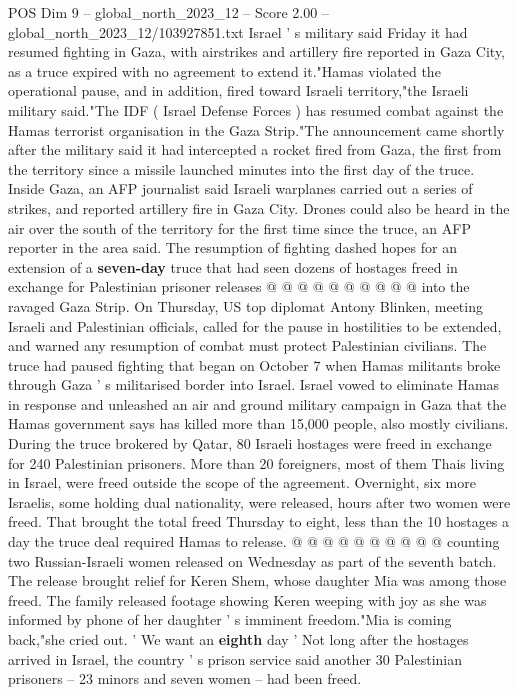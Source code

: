 \begin{textsample}{POS Dim 9 – global\_north\_2023\_12 – Score 2.00 – global\_north\_2023\_12/103927851.txt}  \label{ex:f9_pos_161}
Israel ' s military said Friday it had resumed fighting in Gaza, with airstrikes and artillery fire reported in Gaza City, as a truce expired with no agreement to extend it."Hamas violated the operational pause, and in addition, fired toward Israeli territory,"the Israeli military said."The IDF ( Israel Defense Forces ) has resumed combat against the Hamas terrorist organisation in the Gaza Strip."The announcement came shortly after the military said it had intercepted a rocket fired from Gaza, the first from the territory since a missile launched minutes into the first day of the truce.
Inside Gaza, an AFP journalist said Israeli warplanes carried out a series of strikes, and reported artillery fire in Gaza City.
Drones could also be heard in the air over the south of the territory for the first time since the truce, an AFP reporter in the area said.
The resumption of fighting dashed hopes for an extension of a \textbf{seven-day} truce that had seen dozens of hostages freed in exchange for Palestinian prisoner releases @ @ @ @ @ @ @ @ @ @ into the ravaged Gaza Strip.
On Thursday, US top diplomat Antony Blinken, meeting Israeli and Palestinian officials, called for the pause in hostilities to be extended, and warned any resumption of combat must protect Palestinian civilians.
The truce had paused fighting that began on October 7 when Hamas militants broke through Gaza ' s militarised border into Israel.
Israel vowed to eliminate Hamas in response and unleashed an air and ground military campaign in Gaza that the Hamas government says has killed more than 15,000 people, also mostly civilians.
During the truce brokered by Qatar, 80 Israeli hostages were freed in exchange for 240 Palestinian prisoners.
More than 20 foreigners, most of them Thais living in Israel, were freed outside the scope of the agreement.
Overnight, six more Israelis, some holding dual nationality, were released, hours after two women were freed.
That brought the total freed Thursday to eight, less than the 10 hostages a day the truce deal required Hamas to release. @ @ @ @ @ @ @ @ @ @ counting two Russian-Israeli women released on Wednesday as part of the seventh batch.
The release brought relief for Keren Shem, whose daughter Mia was among those freed.
The family released footage showing Keren weeping with joy as she was informed by phone of her daughter ' s imminent freedom."Mia is coming back,"she cried out. ' We want an \textbf{eighth} day ' Not long after the hostages arrived in Israel, the country ' s prison service said another 30 Palestinian prisoners -- 23 minors and seven women -- had been freed.

\end{textsample}
